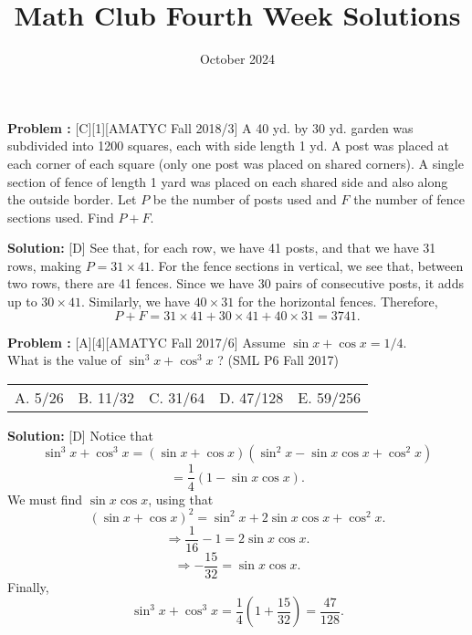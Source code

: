 \documentclass[12pt]{article}
\title{Math Club Fourth Week Solutions}
\date{October 2024}
\makeatletter
\newcounter{problem}
\newenvironment{problem}{%
    \stepcounter{problem}
    \noindent\textbf{Problem \theproblem:}%
}{%
    \par
}
\newenvironment{solution}{%
    \vspace{1em} %
    \noindent\textbf{Solution:}%
}{%
    \par
}
\newcommand{\multChoice}[5]{%
    \begin{tabular}{l @{\hskip 1.5cm} l @{\hskip 1.5cm} l @{\hskip 1.5cm} l @{\hskip 1.5cm} l}
    A. #1 & B. #2 & C. #3 & D. #4 & E. #5
\end{tabular}
}
\makeatother
\begin{document}
\maketitle



\begin{problem}[C][1][AMATYC Fall 2018/3]
A 40 yd. by 30 yd. garden was subdivided into 1200 squares, each with
side length 1 yd. A post was placed at each corner of each square (only one
post was placed on shared corners). A single section of fence of length 1
yard was placed on each shared side and also along the outside border. Let
$P$ be the number of posts used and $F$ the number of fence sections used. Find $P + F$. 
\end{problem}


\begin{solution}[D]
See that, for each row, we have 41 posts, and that we have 31 rows, making $P=31 \times 41$.
For the fence sections in vertical, we see that, between two rows, there are 41 fences. Since we have 30 pairs of consecutive posts, it adds up to $30 \times 41$. Similarly, we have $40 \times 31$ for the horizontal fences. Therefore, 
\[
P+F= 31 \times 41 + 30 \times 41 + 40 \times 31 = 3741.
\]
\end{solution}

\vskip 1cm

\begin{problem}[A][4][AMATYC Fall 2017/6]
Assume $\sin x + \cos x = 1/4$. \\
What is the value of $\sin^3x + \cos^3x $ ? (SML P6 Fall 2017)
\multChoice{5/26}{11/32}{31/64}{47/128}{59/256}
\end{problem}


\begin{solution}[D]
Notice that 
\[
\sin^3x + \cos^3x = (\sin x + \cos x)(\sin^2x - \sin x \cos x + \cos^2x)
\]
\[
= \frac{1}{4} \left ( 1 - \sin x \cos x \right ).
\]
We must find $\sin x \cos x$, using that
\[
(\sin x + \cos x)^2 = \sin^2x + 2\sin x \cos x + \cos^2x.
\]
\[
\Rightarrow \frac{1}{16} - 1 = 2\sin x \cos x.
\]
\[
\Rightarrow -\frac{15}{32} = \sin x \cos x.
\]
Finally,
\[
\sin^3x + \cos^3x = \frac{1}{4} \left ( 1 + \frac{15}{32} \right ) = \frac{47}{128}.
\]
\end{solution}

\vskip 1cm
\end{document}
